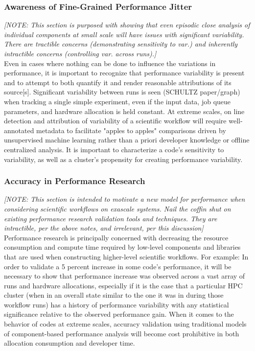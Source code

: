 \documentclass[12pt, conference, compsocconf]{IEEEtran}
\begin{document}
\subsubsection{Awareness of Fine-Grained Performance Jitter}
\textit{[NOTE: This section is purposed with showing that even episodic 
close analysis of individual components at small scale will have issues with 
significant variability. There are tractible 
concerns (demonstrating sensitivity to var.) and inherently intractible 
concerns (controlling var. across runs).]}\\
Even in cases where nothing can be done to influence the variations in 
performance, it is important to recognize that performance variability is 
present and to  attempt to both quantify it and render reasonable attributions 
of its source[s]. Significant variability between runs is seen (SCHULTZ 
paper/graph) when tracking a single simple experiment, even if the input data, 
job queue  parameters, and hardware allocation is held constant. At extreme 
scales, on line detection and attribution of variability of a 
scientific workflow will require well-annotated metadata to facilitate "apples 
to apples" comparisons driven by unsupervised machine learning rather than a 
priori developer knowledge or offline centralized analysis. It is important to 
characterize a code's sensitivity to variability, as well as a cluster's 
propensity for creating performance variability.
\subsubsection{Accuracy in Performance Research}
\textit{[NOTE: This section is intended to motivate a new model for 
performance when 
considering scientific workflows on exascale systems. Nail the coffin shut on 
existing performance research validation tools and techniques. They are 
intractible, per the above notes, and irrelevant, per this discussion]}\\
Performance research is principally concerned with decreasing the resource 
consumption and compute time required by low-level components and libraries 
that are used when constructing higher-level scientific workflows. For example: 
In order to 
validate a 5 percent increase in some code's performance, it will be necessary 
to show that  performance increase was observed across a vast array of runs and 
hardware allocations, especially if it is the case that a particular HPC 
cluster (when in an overall state similar to the one it was in during those 
workflow runs) has a history of performance variability with any statistical 
significance relative to the observed performance gain. When it comes to the 
behavior of codes at extreme scales, accuracy validation using traditional 
models of component-based performance analysis will become cost prohibitive in 
both allocation consumption and developer time.
\end{document}
